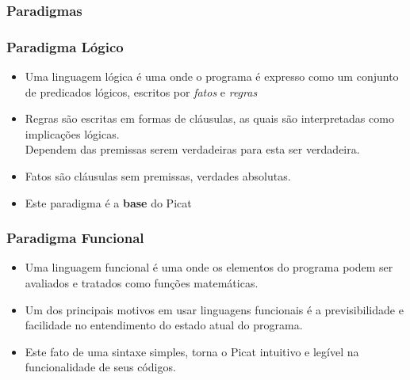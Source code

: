 \subsubsection{Paradigmas}
\begin{frame}[fragile]
	\frametitle{Paradigma Lógico}
    
    \begin{itemize}
    
    	\item Uma linguagem lógica é uma onde o programa é expresso como um conjunto
        de predicados lógicos, escritos por \textit{fatos} e \textit{regras}
    
    \pause
    	\item Regras são escritas em formas de cláusulas, as quais são interpretadas como
        implicações lógicas.\\ 
        Dependem das premissas serem verdadeiras para esta ser verdadeira.
        

    \pause
    	\item Fatos são cláusulas sem premissas, verdades absolutas.

        
        \pause
        \item Este   paradigma é a  \textbf{base} do Picat
    \end{itemize}

\end{frame}


\begin{frame}[fragile]
	\frametitle{Paradigma Funcional}
    
    \begin{itemize}
    
    
    	\item Uma linguagem funcional é uma onde os elementos do programa podem ser avaliados e 
        tratados como funções matemáticas.
        
        \pause
         \item Um dos principais motivos em usar linguagens funcionais é a previsibilidade
         e facilidade no entendimento do estado atual do programa.
         
         \pause
         \item Este fato de uma  sintaxe simples, torna o Picat  intuitivo e legível na
         funcionalidade de seus códigos.
         
    \end{itemize}
    
    
\end{frame}

